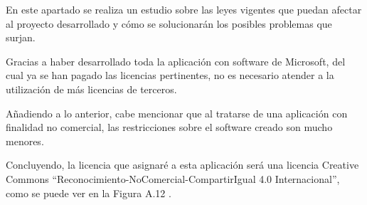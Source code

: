 En este apartado se realiza un estudio sobre las leyes vigentes que puedan afectar al proyecto desarrollado y cómo se solucionarán los posibles problemas que surjan.

Gracias a haber desarrollado toda la aplicación con software de Microsoft, del cual ya se han pagado las licencias pertinentes, no es necesario atender a la utilización de más licencias de terceros.

Añadiendo a lo anterior, cabe mencionar que al tratarse de una aplicación con finalidad no comercial, las restricciones sobre el software creado son mucho menores.

Concluyendo, la licencia que asignaré a esta aplicación será una licencia Creative Commons ``Reconocimiento-NoComercial-CompartirIgual 4.0 Internacional'', como se puede ver en la Figura A.12 \cite{web:cc}.


